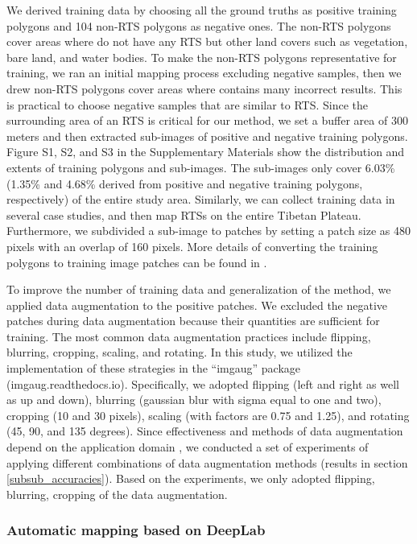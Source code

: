 \documentclass[preprint,12pt,authoryear]{elsarticle}
\begin{document}
We derived training data by choosing all the ground truths as positive training polygons and 104 non-RTS polygons as negative ones. The non-RTS polygons cover areas where do not have any RTS but other land covers such as vegetation, bare land, and water bodies. To make the non-RTS polygons representative for training, we ran an initial mapping process excluding negative samples, then we drew non-RTS polygons cover areas where contains many incorrect results. This is practical to choose negative samples that are similar to RTS. Since the surrounding area of an RTS is critical for our method, we set a buffer area of 300 meters and then extracted sub-images of positive and negative training polygons. Figure S1, S2, and S3 in the Supplementary Materials show the distribution and extents of training polygons and sub-images. The sub-images only cover 6.03\% (1.35\% and 4.68\% derived from positive and negative training polygons, respectively) of the entire study area. Similarly, we can collect training data in several case studies, and then map RTSs on the entire Tibetan Plateau. Furthermore, we subdivided a sub-image to patches by setting a patch size as 480 pixels with an overlap of 160 pixels. More details of converting the training polygons to training image patches can be found in \cite{huang2018automatic}. 

To improve the number of training data and generalization of the method, we applied data augmentation to the positive patches. We excluded the negative patches during data augmentation because their quantities are sufficient for training. The most common data augmentation practices include flipping, blurring, cropping, scaling, and rotating. In this study, we utilized the implementation of these strategies in the “imgaug” package (imgaug.readthedocs.io). Specifically, we adopted flipping (left and right as well as up and down), blurring (gaussian blur with sigma equal to one and two), cropping (10 and 30 pixels), scaling (with factors are 0.75 and 1.25), and rotating (45, 90, and 135 degrees). Since effectiveness and methods of data augmentation depend on the application domain \citep{perez2017effectiveness}, we conducted a set of experiments of applying different combinations of data augmentation methods (results in section \ref{subsub_accuracies}). Based on the experiments, we only adopted flipping, blurring, cropping of the data augmentation. 

\subsubsection{Automatic mapping based on DeepLab}
\label{subsubsec_deeplab}
\end{document}

